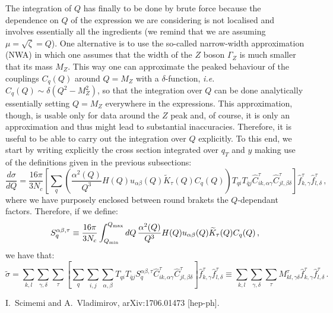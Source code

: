 \documentclass[10pt,a4paper]{article}
\begin{document}
The integration of $Q$ has finally to be done by brute force because
the dependence on $Q$ of the expression we are considering is not
localised and involves essentially all the ingredients (we remind that
we are assuming $\mu=\sqrt{\zeta}=Q$). One alternative is to use the
so-called narrow-width approximation (NWA) in which one assumes that
the width of the $Z$ boson $\Gamma_Z$ is much smaller that its mass
$M_Z$. This way one can approximate the peaked behaviour of the
couplings $C_q(Q)$ around $Q=M_Z$ with a $\delta$-function,
\textit{i.e.} $C_q(Q)\sim \delta(Q^2-M_Z^2)$, so that the integration
over $Q$ can be done analytically essentially setting $Q=M_Z$
everywhere in the expressions. This approximation, though, is usable
only for data around the $Z$ peak and, of course, it is only an
approximation and thus might lead to substantial
inaccuracies. Therefore, it is useful to be able to carry out the
integration over $Q$ explicitly. To this end, we start by writing
explicitly the cross section integrated over $q_T$ and $y$ making use
of the definitions given in the previous subsections:
\begin{equation}
  \frac{d\sigma}{dQ} =\frac{16\pi}{3N_c}\left[\sum_q\left(
    \frac{\alpha^2(Q)}{Q^3} H(Q) u_{\alpha\beta}(Q)
    \widetilde{K}_\tau(Q) C_q(Q)\right)
    T_{qi}T_{\bar{q}j}
    \hat{C}_{ik,\alpha\gamma}^\tau \hat{C}_{jl,\beta\delta}^\tau 
  \right]\hat{f}_{k,\gamma}^{\tau}
  \hat{f}_{l,\delta}^{\tau}\,,
\end{equation}
where we have purposely enclosed between round brakets the
$Q$-dependant factors. Therefore, if we define:
\begin{equation}
S_{q}^{\alpha\beta,\tau}\equiv \frac{16\pi}{3N_c}\int_{Q_{\rm min}}^{Q_{\rm max}}dQ\,
    \frac{\alpha^2(Q)}{Q^3} H(Q) u_{\alpha\beta}(Q)
    \widetilde{K}_\tau(Q) C_q(Q)\,,
\end{equation}
we have that:
\begin{equation}
  \widetilde{\sigma} =\sum_{k,l}\sum_{\gamma,\delta}\sum_\tau \left[\sum_q \sum_{i,j} \sum_{\alpha,\beta}
    T_{qi}T_{\bar{q}j} S_{q}^{\alpha\beta,\tau}
    \hat{C}_{ik,\alpha\gamma}^\tau \hat{C}_{jl,\beta\delta}^\tau 
  \right]\hat{f}_{k,\gamma}^{\tau}
  \hat{f}_{l,\delta}^{\tau}\equiv \sum_{k,l}\sum_{\gamma,\delta}\sum_\tau M^\tau_{kl,\gamma\delta}\hat{f}_{k,\gamma}^{\tau}
  \hat{f}_{l,\delta}^{\tau} \,.
\end{equation}

\begin{thebibliography}{alp}

  I.~Scimemi and A.~Vladimirov,
  arXiv:1706.01473 [hep-ph].

\end{thebibliography}
\end{document}
